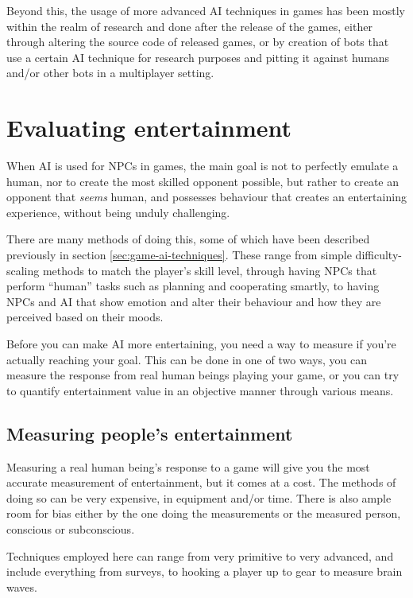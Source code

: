 Beyond this, the usage of more advanced AI techniques in games has been mostly
within the realm of research and done after the release of the games, either
through altering the source code of released games, or by creation of bots that
use a certain AI technique for research purposes and pitting it against humans
and/or other bots in a multiplayer setting.

\section{Evaluating entertainment}
\label{sec:eval-entert}

When AI is used for NPCs in games, the main goal is not to perfectly emulate a
human, nor to create the most skilled opponent possible, but rather to create an
opponent that \emph{seems} human, and possesses behaviour that creates an
entertaining experience, without being unduly challenging.

There are many methods of doing this, some of which have been described
previously in section \ref{sec:game-ai-techniques}. These range from simple
difficulty-scaling methods to match the player's skill level, through having
NPCs that perform ``human'' tasks such as planning and cooperating smartly, to
having NPCs and AI that show emotion and alter their behaviour and how they are
perceived based on their moods.

Before you can make AI more entertaining, you need a way to measure if you're
actually reaching your goal. This can be done in one of two ways, you can
measure the response from real human beings playing your game, or you can try to
quantify entertainment value in an objective manner through various means.

\subsection{Measuring people's entertainment}
\label{sec:measuring-people}

Measuring a real human being's response to a game will give you the most
accurate measurement of entertainment, but it comes at a cost. The methods of
doing so can be very expensive, in equipment and/or time. There is also ample
room for bias either by the one doing the measurements or the measured person,
conscious or subconscious.

Techniques employed here can range from very primitive to very advanced, and
include everything from surveys, to hooking a player up to gear to measure brain
waves.

